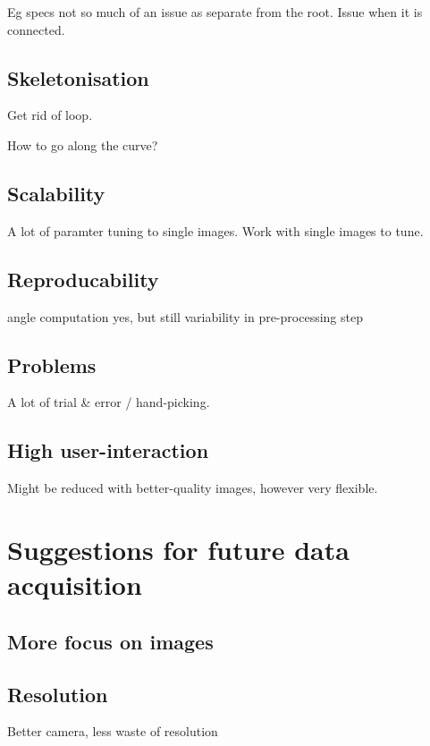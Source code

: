 Eg specs not so much of an issue as separate from the root.
Issue when it is connected.

\subsection{Skeletonisation}
Get rid of loop.

How to go along the curve?

\subsection{Scalability}

A lot of paramter tuning to single images. Work with single images to tune.


\subsection{Reproducability}

angle computation yes, but still variability in pre-processing step

\subsection{Problems}
A lot of trial \& error / hand-picking. 

\subsection{High user-interaction}
Might be reduced with better-quality images, however very flexible.


\section{Suggestions for future data acquisition}


\subsection{More focus on images}

\subsection{Resolution}

Better camera, less waste of resolution
 
